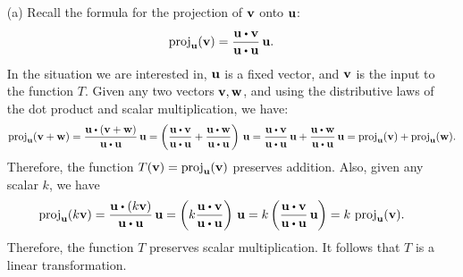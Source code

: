 \begin{solution}
  \begin{enumerate}
  \item[(a)] Recall the formula for the projection of $\vect{v}$ onto
    $\vect{u}$:
    \begin{equation*}
      \proj_{\vect{u}}(\vect{v})
      = \frac{\vect{u}\dotprod \vect{v}}{\vect{u}\dotprod \vect{u}}\,\vect{u}.
    \end{equation*}
    In the situation we are interested in, $\vect{u}$ is a fixed vector,
    and $\vect{v}$ is the input to the function $T$. Given any two
    vectors $\vect{v},\vect{w}$, and using the distributive laws of the dot
    product and scalar multiplication, we have:
    \begin{equation*}
      \proj_{\vect{u}}(\vect{v}+\vect{w})
      = \frac{\vect{u}\dotprod(\vect{v}+\vect{w})}{\vect{u}\dotprod \vect{u}}\,\vect{u}
      = \paren{\frac{\vect{u}\dotprod \vect{v}}{\vect{u}\dotprod \vect{u}}
        + \frac{\vect{u}\dotprod \vect{w}}{\vect{u}\dotprod \vect{u}}}\,\vect{u}
      = \frac{\vect{u}\dotprod \vect{v}}{\vect{u}\dotprod \vect{u}}\,\vect{u}
      + \frac{\vect{u}\dotprod \vect{w}}{\vect{u}\dotprod \vect{u}}\,\vect{u}
      = \proj_{\vect{u}}(\vect{v})
      + \proj_{\vect{u}}(\vect{w}).
    \end{equation*}
    Therefore, the function
    $T(\vect{v}) = \proj_{\vect{u}}(\vect{v})$ preserves
    addition. Also, given any scalar $k$, we have
    \begin{equation*}
      \proj_{\vect{u}}(k\vect{v})
      = \frac{\vect{u}\dotprod (k\vect{v})}{\vect{u}\dotprod \vect{u}}\,\vect{u}
      = \paren{k\frac{\vect{u}\dotprod \vect{v}}{\vect{u}\dotprod \vect{u}}}\,\vect{u}
      = k\paren{\frac{\vect{u}\dotprod \vect{v}}{\vect{u}\dotprod \vect{u}}\,\vect{u}}
      = k\,\proj_{\vect{u}}(\vect{v}).
    \end{equation*}
    Therefore, the function $T$ preserves scalar multiplication. It
    follows that $T$ is a linear transformation.


\end{enumerate}
\end{solution}
